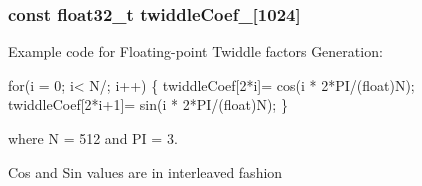 \subsubsection[{\texorpdfstring{twiddle\+Coef\+\_\+512}{twiddleCoef_512}}]{\setlength{\rightskip}{0pt plus 5cm}const float32\+\_\+t twiddle\+Coef\+\_\mbox{[}1024\mbox{]}}\hypertarget{group__CFFT__CIFFT_gad8830f0c068ab2cc19f2f87d220fa148}{}\label{group__CFFT__CIFFT_gad8830f0c068ab2cc19f2f87d220fa148}
\begin{DoxyParagraph}{}
Example code for Floating-\/point Twiddle factors Generation\+: 
\end{DoxyParagraph}
\begin{DoxyParagraph}{}

\begin{DoxyPre}for(i = 0; i< N/; i++)
\{
  twiddleCoef[2*i]= cos(i * 2*PI/(float)N);
  twiddleCoef[2*i+1]= sin(i * 2*PI/(float)N);
\} \end{DoxyPre}
 
\end{DoxyParagraph}
\begin{DoxyParagraph}{}
where N = 512 and PI = 3. 
\end{DoxyParagraph}
\begin{DoxyParagraph}{}
Cos and Sin values are in interleaved fashion 
\end{DoxyParagraph}
